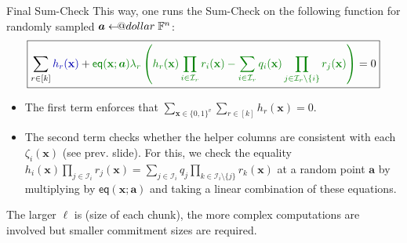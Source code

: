 \documentclass{zkdl-presentation-template}
\makeatletter
\newcommand\leftarrowS{\leftarrow\joinrel\smalldollar}
\newcommand{\smalldollar}{\mathrel{\mathpalette\small@dollar\relax}}
\newcommand{\small@dollar}[2]{%
  \vcenter{\hbox{%
    $#1\textnormal{\fontsize{0.7\dimexpr\f@size pt}{0}\selectfont\$}$%
  }}%
}
\makeatother
\begin{document}
    \begin{frame}{Final Sum-Check}
        This way, one runs the Sum-Check on the following function for
        randomly sampled $\boldsymbol{a} \leftarrowS \mathbb{F}^n$:
        \begin{equation*}
            \boxed{\sum_{r \in [k]} \textcolor{blue!70!black}{h_r(\mathbf{x})} + \textcolor{green!50!black}{\mathsf{eq}(\mathbf{x};\boldsymbol{a})\lambda_r\left(h_r(\mathbf{x})\prod_{i \in \mathcal{I}_r}r_i(\mathbf{x}) - \sum_{i \in \mathcal{I}_r}q_i(\mathbf{x})\prod_{j \in \mathcal{I}_r \setminus \{i\}} r_j(\mathbf{x})\right)} = 0}
        \end{equation*}

        \pause\begin{itemize}
            \item The \textcolor{blue!70!black}{first term} enforces that
            $\sum_{\mathbf{x} \in \{0,1\}^v}\sum_{r \in [k]}h_r(\mathbf{x}) =
            0$.\pause
            \item The \textcolor{green!50!black}{second term} checks whether the
            helper columns are consistent with each $\zeta_i(\mathbf{x})$ (see
            prev. slide). For this, we check the equality
            $h_i(\mathbf{x})\prod_{j \in \mathcal{I}_i}r_j(\mathbf{x}) = \sum_{j
            \in \mathcal{I}_i}q_j\prod_{k \in \mathcal{I}_i \setminus
            \{j\}}r_k(\mathbf{x})$ at a random point $\boldsymbol{a}$ by
            multiplying by $\mathsf{eq}(\mathbf{x};\boldsymbol{a})$ and taking a
            linear combination of these equations.\pause
        \end{itemize}

        \begin{lemma}
            The larger $\ell$ is (size of each chunk), the more complex
            computations are involved but smaller commitment sizes are required. 
        \end{lemma}
    \end{frame}
\end{document}
